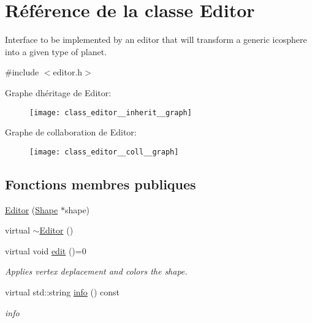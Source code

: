 \hypertarget{class_editor}{}\section{Référence de la classe Editor}
\label{class_editor}


Interface to be implemented by an editor that will transform a generic icosphere into a given type of planet.  




{\ttfamily \#include $<$editor.\+h$>$}



Graphe d\textquotesingle{}héritage de Editor\+:\nopagebreak
\begin{figure}[H]
\begin{center}
\leavevmode
\texttt{[image: class\_editor\_\_inherit\_\_graph]}
\end{center}
\end{figure}


Graphe de collaboration de Editor\+:\nopagebreak
\begin{figure}[H]
\begin{center}
\leavevmode
\texttt{[image: class\_editor\_\_coll\_\_graph]}
\end{center}
\end{figure}
\subsection*{Fonctions membres publiques}
\begin{DoxyCompactItemize}
\item 
\hyperlink{class_editor_aea7f803e3bbb79dbbeb9a9ad9b01ed5a}{Editor} (\hyperlink{class_shape}{Shape} $\ast$shape)
\item 
virtual \hyperlink{class_editor_ab9aea98e4964b437a937354d2f3edd42}{$\sim$\+Editor} ()
\item 
virtual void \hyperlink{class_editor_abca97ba11536c494a0c26bac77917792}{edit} ()=0
\begin{DoxyCompactList}\small\item\em Applies vertex deplacement and colors the shape. \end{DoxyCompactList}\item 
virtual std\+::string \hyperlink{class_editor_a5747cd74b71d67f6d39b094071058382}{info} () const
\begin{DoxyCompactList}\small\item\em info \end{DoxyCompactList}\end{DoxyCompactItemize}

